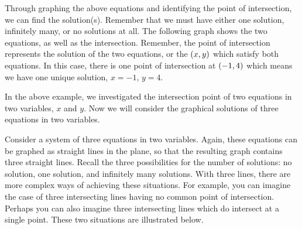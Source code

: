 \begin{solution} Through graphing the above equations and identifying the point of intersection, we can find the solution(s). Remember that we must have either one solution, infinitely many, or no solutions at all. 
 The following graph shows the two equations,
as well as the intersection. Remember, the point of intersection represents the solution of
the two equations, or the $\left(x,y\right)$ which satisfy both equations. In this case,
there is one point of intersection at $\left(-1, 4 \right)$ which means we have one unique solution, $x = -1$, $y = 4$.

\begin{center}
\vspace{-2ex}
\end{center}
\end{solution}

In the above example, we investigated the intersection point of two equations in two variables, $x$ and $y$. Now we will consider 
the graphical solutions of three equations in two variables.

Consider a system of three equations in two variables. Again, these equations can be graphed as
straight lines in the plane, so that the resulting graph contains three straight lines. Recall the three possibilities for the number of solutions: no solution, one solution, and infinitely many solutions.
With three lines, there are more complex ways of achieving these situations. For example, you can imagine the case of three intersecting
lines having no common point of intersection. Perhaps you can also imagine three intersecting lines
which do intersect at a single point. These two situations are illustrated below. 

